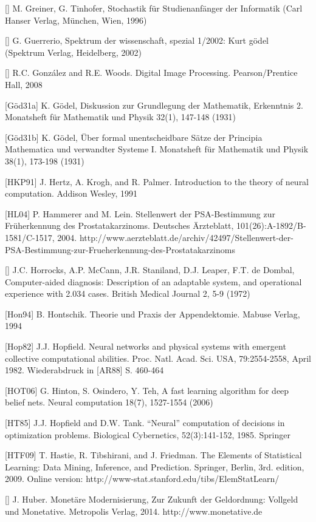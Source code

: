 \documentclass[10pt]{book}
\begin{document}
\begin{center}
[\cite{gt96}] M. Greiner, G. Tinhofer, Stochastik für Studienanfänger der Informatik (Carl Hanser Verlag, München, Wien, 1996)

[\cite{gue02}] G. Guerrerio, Spektrum der wissenschaft, spezial 1/2002: Kurt gödel (Spektrum Verlag, Heidelberg, 2002)

[\cite{gw08}] R.C. González and R.E. Woods. Digital Image Processing. Pearson/Prentice Hall, 2008

[Göd31a] K. Gödel, Diskussion zur Grundlegung der Mathematik, Erkenntnis 2. Monatsheft für Mathematik und Physik 32(1), 147-148 (1931)

[Göd31b] K. Gödel, Über formal unentscheidbare Sätze der Principia Mathematica und verwandter Systeme I. Monatsheft für Mathematik und Physik 38(1), 173-198 (1931)

[HKP91] J. Hertz, A. Krogh, and R. Palmer. Introduction to the theory of neural computation. Addison Wesley, 1991

[HL04] P. Hammerer and M. Lein. Stellenwert der PSA-Bestimmung zur Früherkennung des Prostatakarzinoms. Deutsches Ärzteblatt, 101(26):A-1892/B-1581/C-1517, 2004. http://www.aerzteblatt.de/archiv/42497/Stellenwert-der-PSA-Bestimmung-zur-Frueherkennung-des-Prostatakarzinoms

[\cite{hms72}] J.C. Horrocks, A.P. McCann, J.R. Staniland, D.J. Leaper, F.T. de Dombal, Computer-aided diagnosis: Description of an adaptable system, and operational experience with 2.034 cases. British Medical Journal 2, 5-9 (1972)

[Hon94] B. Hontschik. Theorie und Praxis der Appendektomie. Mabuse Verlag, 1994

[Hop82] J.J. Hopfield. Neural networks and physical systems with emergent collective computational abilities. Proc. Natl. Acad. Sci. USA, 79:2554-2558, April 1982. Wiederabdruck in [AR88] S. 460-464

[HOT06] G. Hinton, S. Osindero, Y. Teh, A fast learning algorithm for deep belief nets. Neural computation 18(7), 1527-1554 (2006)

[HT85] J.J. Hopfield and D.W. Tank. ``Neural'' computation of decisions in optimization problems. Biological Cybernetics, 52(3):141-152, 1985. Springer

[HTF09] T. Hastie, R. Tibshirani, and J. Friedman. The Elements of Statistical Learning: Data Mining, Inference, and Prediction. Springer, Berlin, 3rd. edition, 2009. Online version: http://www-stat.stanford.edu/tibs/ElemStatLearn/

[\cite{hub14}] J. Huber. Monetäre Modernisierung, Zur Zukunft der Geldordnung: Vollgeld und Monetative. Metropolis Verlag, 2014. http://www.monetative.de


\end{center}
\end{document}
